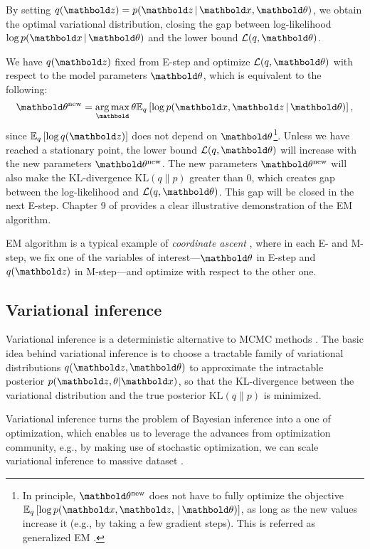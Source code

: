 By setting $q(\mbz) = p(\mbz \g \mbx, \mb\theta)$, we obtain the optimal variational distribution, closing the gap between log-likelihood $\log p(\mbx \g \mb\theta)$ and the lower bound $\cL(q, \mb\theta)$. 

 We have $q(\mbz)$ fixed from E-step and optimize $\cL(q, \mb\theta)$ with respect to the model parameters $\mb\theta$, which is equivalent to the following:
\begin{equation*}
\mb\theta^\new = \argmax_\mb\theta \EE{q}{\log p(\mbx, \mbz \g \mb\theta)},
\end{equation*}
since $\EE{q}{\log q(\mbz)}$ does not depend on $\mb\theta$\footnote{In principle, $\mb\theta^\new$ does not have to fully optimize the objective $\EE{q}{\log p(\mbx, \mbz, \g \mb\theta)}$, as long as the new values increase it (e.g., by taking a few gradient steps). This is referred as generalized \gls{EM} \citep{neal1998view}.}. Unless we have reached a stationary point, the lower bound $\cL(q, \mb\theta)$ will increase with the new parameters $\mb\theta^\new$. The new parameters $\mb\theta^\new$ will also make the \gls{KL}-divergence $\textrm{KL}(q \| p)$ greater than $0$, which creates gap between the log-likelihood and $\cL(q, \mb{\theta})$. This gap will be closed in the next E-step. Chapter 9 of \citet{Bishop:2006:PRM:1162264} provides a clear illustrative demonstration of the \gls{EM} algorithm.  

\gls{EM} algorithm is a typical example of \textit{coordinate ascent} \citep{bertsekas1999nonlinear}, where in each E- and M-step, we fix one of the variables of interest---$\mb\theta$ in E-step and $q(\mbz)$ in M-step---and optimize with respect to the other one.


\subsection{Variational inference}\label{chpt:background:sec:vi}

\PP Variational inference is a deterministic alternative to \gls{MCMC} methods \citep{jordan1999introduction,wainwright2008graphical,blei2016variational}. The basic idea behind variational inference is to choose a tractable family of variational distributions $q(\mbz, \mb\theta)$ to approximate the intractable posterior $p(\mbz, \theta | \mbx)$, so that the \gls{KL}-divergence between the variational distribution and the true posterior $\textrm{KL}(q \| p)$ is minimized.

Variational inference turns the problem of Bayesian inference into a one of  optimization, which enables us to leverage the advances from optimization community, e.g., by making use of stochastic optimization, we can scale variational inference to massive dataset \citep{hoffman2013stochastic}.

